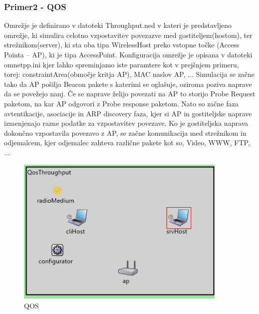\documentclass[11pt,a4paper,slovene]{myarticle}
\begin{document}
\subsubsection{Primer2 - QOS}
Omrežje je definirano v datoteki Throughput.ned v kateri je predstavljeno omrežje, ki simulira celotno vzpostavitev povezazve med gostiteljem(hostom), ter strežnikom(server), ki sta oba tipa WirelessHost preko vstopne točke (Access Pointa – AP), ki je tipa AccessPoint. Konfiguracija omrežje je opisana v datoteki omnetpp.ini kjer lahko spreminjamo iste paramtere kot v prejšnjem primeru, torej: constraintArea(območje kritja AP), MAC naslov AP, ... Simulacija se začne tako da AP pošilja Beacon pakete s katerimi se oglašuje, oziroma poziva naprave da se povežejo nanj. Če se naprave želijo povezati na AP to storijo Probe Request paketom, na kar AP 	odgovori z Probe response paketom. Nato so začne faza avtentikacije, asociacije in ARP discovery faza, kjer si AP in gostiteljske naprave izmenjenajo razne podatke za vzpostavitev povezave. Ko je gostiteljska naprava dokončno vzpostavila povezavo z AP, se začne komunikacija med strežnikom in odjemalcem, kjer odjemalec zahteva različne pakete kot so, Video, WWW, FTP, ...
\begin{figure}[h!]
	\centering
		\includegraphics[width=0.9\textwidth, keepaspectratio=true]{./images/qos.png}
	\caption{QOS}
	\label{fig:QOS}
\end{figure}
\end{document}
